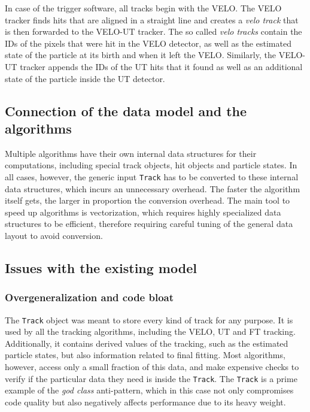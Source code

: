 \documentclass[12pt]{article}
\newcommand{\code}[1]{\texttt{#1}}
\begin{document}
In case of the trigger software, all tracks begin with the VELO. The VELO tracker finds hits that are aligned in a straight line and creates a \textit{velo track} that is then forwarded to the VELO-UT tracker. The so called \textit{velo tracks} contain the IDs of the pixels that were hit in the VELO detector, as well as the estimated state of the particle at its birth and when it left the VELO. Similarly, the VELO-UT tracker appends the IDs of the UT hits that it found as well as an additional state of the particle inside the UT detector.


\subsection{Connection of the data model and the algorithms}

Multiple algorithms have their own internal data structures for their computations, including special track objects, hit objects and particle states. In all cases, however, the generic input \code{Track} has to be converted to these internal data structures, which incurs an unnecessary overhead. The faster the algorithm itself gets, the larger in proportion the conversion overhead. The main tool to speed up algorithms is vectorization, which requires highly specialized data structures to be efficient, therefore requiring careful tuning of the general data layout to avoid conversion.

\subsection{Issues with the existing model}\label{sec_datamodel_issues}

\subsubsection{Overgeneralization and code bloat}

The \code{Track} object was meant to store every kind of track for any purpose. It is used by all the tracking algorithms, including the VELO, UT and FT tracking. Additionally, it contains derived values of the tracking, such as the estimated particle states, but also information related to final fitting. Most algorithms, however, access only a small fraction of this data, and make expensive checks to verify if the particular data they need is inside the \code{Track}. The \code{Track} is a prime example of the \textit{god class} anti-pattern\cite{god_class_wiki}, which in this case not only compromises code quality but also negatively affects performance due to its heavy weight.
\end{document}
